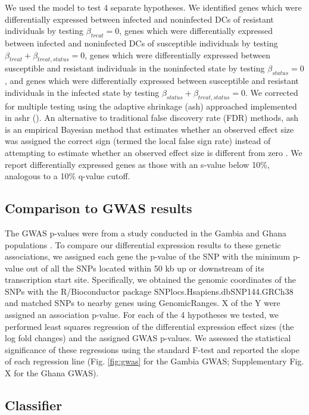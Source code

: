 \documentclass[fleqn,10pt]{wlscirep}
\begin{document}
We used the model to test 4 separate hypotheses. We identified genes which were differentially expressed between infected and noninfected DCs of resistant individuals by testing $\beta_{treat} = 0$, genes which were differentially expressed between infected and noninfected DCs of susceptible individuals by testing $\beta_{treat} + \beta_{treat,status} = 0$, genes which were differentially expressed between susceptible and resistant individuals in the noninfected state by testing $\beta_{status} = 0$, and genes which were differentially expressed between susceptible and resistant individuals in the infected state by testing $\beta_{status} + \beta_{treat,status} = 0$. We corrected for multiple testing using the adaptive shrinkage (ash) approached implemented in ashr (). An alternative to traditional false discovery rate (FDR) methods, ash is an empirical Bayesian method that estimates whether an observed effect size was assigned the correct sign (termed the local false sign rate) instead of attempting to estimate whether an observed effect size is different from zero \cite{Stephens2016}. We report differentially expressed genes as those with an s-value below 10\%, analogous to a 10\% q-value cutoff.
\subsection*{Comparison to GWAS results}

The GWAS p-values were from a study conducted in the Gambia and Ghana populations \cite{Thye2010}. To compare our differential expression results to these genetic associations, we assigned each gene the p-value of the SNP with the minimum p-value out of all the SNPs located within 50 kb up or downstream of its transcription start site. Specifically, we obtained the genomic coordinates of the SNPs with the R/Bioconductor package SNPlocs.Hsapiens.dbSNP144.GRCh38 and matched SNPs to nearby genes using GenomicRanges. X of the Y were assigned an association p-value. For each of the 4 hypotheses we tested, we performed least squares regression of the differential expression effect sizes (the log fold changes) and the assigned GWAS p-values. We assessed the statistical significance of these regressions using the standard F-test and reported the slope of each regression line (Fig. \ref{fig:gwas} for the Gambia GWAS; Supplementary Fig. X for the Ghana GWAS).
\subsection*{Classifier}
\end{document}
